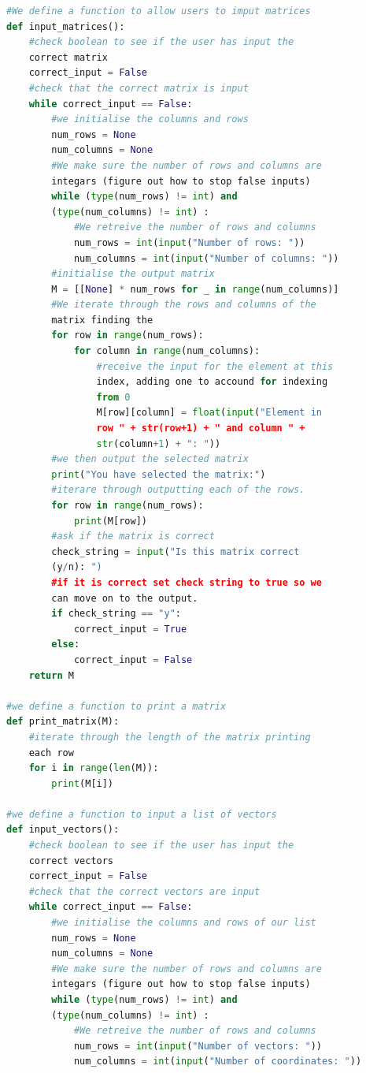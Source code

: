 \documentclass{article}
\begin{document}
\begin{lstlisting}[language=Python, caption=Functions In Linear Algebra, label=fuctions]
#We define a function to allow users to imput matrices
def input_matrices():
    #check boolean to see if the user has input the 
    correct matrix
    correct_input = False
    #check that the correct matrix is input
    while correct_input == False:
        #we initialise the columns and rows
        num_rows = None
        num_columns = None
        #We make sure the number of rows and columns are 
        integars (figure out how to stop false inputs)
        while (type(num_rows) != int) and 
        (type(num_columns) != int) :
            #We retreive the number of rows and columns
            num_rows = int(input("Number of rows: "))
            num_columns = int(input("Number of columns: "))
        #initialise the output matrix
        M = [[None] * num_rows for _ in range(num_columns)]
        #We iterate through the rows and columns of the 
        matrix finding the 
        for row in range(num_rows):
            for column in range(num_columns):
                #receive the input for the element at this 
                index, adding one to accound for indexing 
                from 0
                M[row][column] = float(input("Element in 
                row " + str(row+1) + " and column " + 
                str(column+1) + ": "))
        #we then output the selected matrix
        print("You have selected the matrix:")
        #iterare through outputting each of the rows.
        for row in range(num_rows):
            print(M[row])
        #ask if the matrix is correct
        check_string = input("Is this matrix correct 
        (y/n): ")
        #if it is correct set check string to true so we 
        can move on to the output.
        if check_string == "y":
            correct_input = True
        else:
            correct_input = False
    return M

#we define a function to print a matrix
def print_matrix(M):
    #iterate through the length of the matrix printing 
    each row
    for i in range(len(M)):
        print(M[i])

#we define a function to input a list of vectors
def input_vectors():
    #check boolean to see if the user has input the 
    correct vectors
    correct_input = False
    #check that the correct vectors are input
    while correct_input == False:
        #we initialise the columns and rows of our list
        num_rows = None
        num_columns = None
        #We make sure the number of rows and columns are 
        integars (figure out how to stop false inputs)
        while (type(num_rows) != int) and 
        (type(num_columns) != int) :
            #We retreive the number of rows and columns
            num_rows = int(input("Number of vectors: "))
            num_columns = int(input("Number of coordinates: "))
            

\end{lstlisting}
\end{document}
